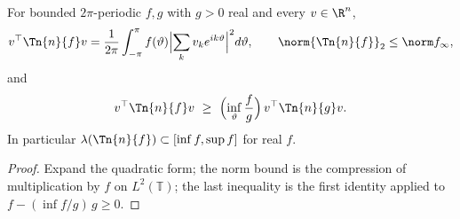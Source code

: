 \begin{lemma}\label{lem:toeplitz}
For bounded $2\pi$-periodic $f,g$ with $g>0$ real and every $v\in\R^n$,
\[
 v^\top\Tn{n}{f}v=\frac1{2\pi}\int_{-\pi}^{\pi}f(\vartheta)\Bigl|\sum_kv_ke^{ik\vartheta}\Bigr|^2d\vartheta,
 \qquad
 \norm{\Tn{n}{f}}_2\le\norm f_\infty,
\]
and
\[
 v^\top\Tn{n}{f}v\ \ge\ \Bigl(\inf_\vartheta\frac{f}{g}\Bigr)\,v^\top\Tn{n}{g}v .
\]
In particular $\lambda(\Tn{n}{f})\subset[\inf f,\sup f]$ for real $f$.
\end{lemma}
\begin{proof}
Expand the quadratic form; the norm bound is the compression of
multiplication by $f$ on $L^2(\mathbb T)$; the last inequality is the first
identity applied to $f-(\inf f/g)\,g\ge0$.
\end{proof}
